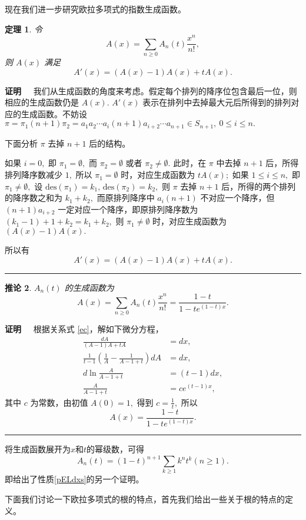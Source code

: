 \documentclass[a4paper,11pt]{article}
\newtheorem{thm}{定理}[section]
\newtheorem{coro}[thm]{推论}
\def\qed{\nopagebreak\hfill{\rule{4pt}{7pt}}\medbreak}
\def\pf{{\bf 证明~~ }}
\def \des{\mathrm{des}}
\begin{document}
现在我们进一步研究欧拉多项式的指数生成函数。

\begin{thm} \label{ec}
令 $$A(x)=\sum_{n\geq0}A_n(t)\frac{x^n}{n!},$$ 则 $A(x)$ 满足
\begin{equation}
A'(x)=(A(x)-1)A(x)+tA(x).
\end{equation}
\end{thm}
\pf
我们从生成函数的角度来考虑。假定每个排列的降序位包含最后一位，则相应的生成函数仍是
$A(x).$ $A'(x)$
表示在排列中去掉最大元后所得到的排列对应的生成函数。不妨设
$\pi=\pi_1(n+1)\pi_2=a_1a_2\cdots a_i(n+1)a_{i+2}\cdots a_{n+1}\in
S_{n+1},\ 0\leq i\leq n.$

下面分析 $\pi$ 去掉 $n+1$ 后的结构。

如果 $i=0,$ 即 $\pi_1=\emptyset,$ 而 $\pi_2=\emptyset$ 或者
$\pi_2\neq \emptyset.$ 此时，在 $\pi$ 中去掉 $n+1$
后，所得排列降序数减少 $1,$ 所以 $\pi_1=\emptyset$
时，对应生成函数为 $tA(x);$ 如果 $1\leq i\leq n,$ 即 $\pi_1\neq
\emptyset,$ 设 $\des(\pi_1)=k_1,\,\des(\pi_2)=k_2,$ 则 $\pi$ 去掉
$n+1$ 后，所得的两个排列的降序数之和为 $k_1+k_2,$ 而原排列降序中
$a_i(n+1)$ 不对应一个降序，但 $(n+1)a_{i+2}$
一定对应一个降序，即原排列降序数为
$\left(k_1-1\right)+1+k_2=k_1+k_2,$ 则 $\pi_1\neq \emptyset$
时，对应生成函数为 $(A(x)-1)A(x).$

所以有 $$A'(x)=(A(x)-1)A(x)+tA(x).$$ \qed

\begin{coro}
$A_n(t)$ 的生成函数为
$$A(x)=\sum_{n\geq
0}A_n(t)\frac{x^n}{n!}=\frac{1-t}{1-te^{(1-t)x}}.$$
\end{coro}
\pf 根据关系式 \eqref{ec}，解如下微分方程， \allowdisplaybreaks
\begin{align*}\frac{d A}{(A-1)A+tA}&=d x,\\[5pt]
\frac{1}{t-1}\left(\frac{1}{A}-\frac{1}{A-1+t}\right)d A&=dx,\\[5pt]
 d\ln\frac{A}{A-1+t}&=(t-1)dx,\\[5pt]
\frac{A}{A-1+t}&=ce^{(t-1)x},
\end{align*}其中 $c$ 为常数，由初值 $A(0)=1,$ 得到 $c=\frac{1}{t},$
所以 $$A(x)=\frac{1-t}{1-te^{(1-t)x}}.$$ \qed

将生成函数展开为$x$和$t$的幂级数，可得
\begin{equation}\label{Ant}
A_n(t)=(1-t)^{n+1}\sum_{k\geq1}k^nt^k (n\geq1).
\end{equation}
即给出了性质\ref{pELdxs}的另一个证明。




下面我们讨论一下欧拉多项式的根的特点，首先我们给出一些关于根的特点的定义。
\end{document}
